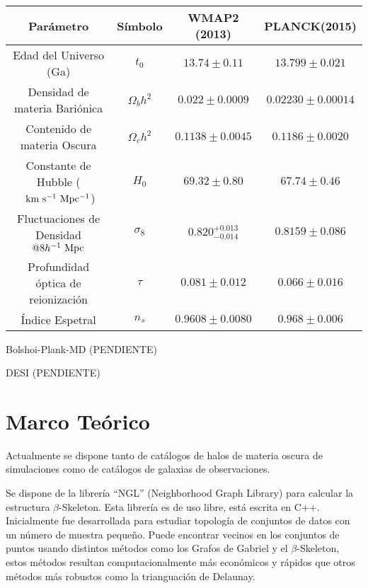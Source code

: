\documentclass[preprint]{aastex62}
\begin{document}
\begin{table}[htb]
    \begin{tabular}{|cc|cc| }
      \hline
      Parámetro & Símbolo & WMAP2 (2013)& PLANCK(2015)  \\
      \hline
      Edad del Universo (Ga) & $t_0$ & $13.74\pm0.11$ & $13.799\pm0.021$ \\
      Densidad de materia Bariónica & $\Omega_b h^2$ & $0.022 \pm 0.0009$ & $0.02230\pm 0.00014$ \\
      Contenido de materia Oscura & $\Omega_c h^2$ & $0.1138\pm0.0045$ & $0.1186\pm0.0020$\\
      Constante de Hubble ($\rm~km~s^{-1}~Mpc^{-1}$) & $H_0 $ & $ 69.32 \pm 0.80 $  & $ 67.74 \pm 0.46 $\\
      Fluctuaciones de Densidad $@ 8 h^{-1} \rm~Mpc$ & $\sigma_8$ & $0.820^{+0.013}_{-0.014}$ & $0.8159 \pm 0.086$ \\  
      Profundidad óptica de reionización & $\tau$ & $ 0.081\pm0.012$  & $0.066 \pm 0.016$ \\
      Índice Espetral & $n_s$ & $ 0.9608 \pm 0.0080 $  & $ 0.968 \pm 0.006 $ \\
      \hline
    \end{tabular}
  \end{table}
  
  
\medskip

Bolshoi-Plank-MD (PENDIENTE)

\medskip

DESI (PENDIENTE)

  \section{Marco Teórico}

  Actualmente se dispone tanto de catálogos de halos de materia oscura de simulaciones como de catálogos de
  galaxias de observaciones.

  Se dispone de la librería ``NGL''\citep{ngl} (Neighborhood Graph Library)
  para calcular la estructura $\beta$-Skeleton. Esta librería es de uso libre, está escrita en C++.
  Inicialmente fue desarrollada para estudiar topología de conjuntos de datos con un número de muestra
  pequeño. Puede encontrar vecinos en los conjuntos de puntos usando distintos métodos como los
  Grafos de Gabriel y el $\beta$-Skeleton, estos métodos resultan computacionalmente más económicos
  y rápidos que otros métodos más robustos como la trianguación de Delaunay.
\end{document}
